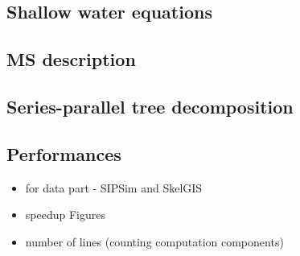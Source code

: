 \subsection{Shallow water equations}
\subsection{MS description}
\subsection{Series-parallel tree decomposition}
\subsection{Performances}
\begin{itemize}
\item for data part - SIPSim and SkelGIS
\item speedup Figures
\item number of lines (counting computation components)
\end{itemize}